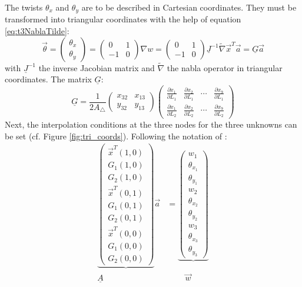   The twists $\theta_x$ and $\theta_y$ are to be described in Cartesian coordinates. They must be transformed into triangular coordinates with the help of equation \eqref{eq:t3NablaTilde}:
  \begin{equation}
  \vec{\theta} = \begin{pmatrix}
  \theta_x\\\theta_y
  \end{pmatrix} = \begin{pmatrix}
  0 & 1 \\ -1 & 0
  \end{pmatrix} \nabla w = \begin{pmatrix}
  0 & 1 \\ -1 & 0
  \end{pmatrix} \underline{J}^{-1} \tilde{\nabla} \vec{x}^T \vec{a} = \underline{G} \vec{a}
  \end{equation}
  with $\underline{J}^{-1}$ the inverse Jacobian matrix and $\tilde{\nabla}$ the nabla operator in triangular coordinates. The matrix $\underline{G}$:
  \begin{equation}
  \underline{G} = \frac{1}{2 A_\triangle} \begin{pmatrix}
  x_{32} & x_{13} \\ y_{32} & y_{13}
  \end{pmatrix} \begin{pmatrix}
  \frac{\partial x_1}{\partial L_1} & \frac{\partial x_2}{\partial L_1} & \cdots & \frac{\partial x_9}{\partial L_1} \\
  \frac{\partial x_1}{\partial L_2} & \frac{\partial x_2}{\partial L_2} & \cdots & \frac{\partial x_9}{\partial L_2}
  \end{pmatrix}
  \end{equation}
  Next, the interpolation conditions at the three nodes for the three unknowns can be set (cf. Figure \ref{fig:tri_coords}). Following the notation of \cite{steinke2005finite}:
  \begin{align}
  \underbrace{\begin{pmatrix}
  	\vec{x}^T(1,0)\\G_1(1,0)\\G_2(1,0)\\
  	\vec{x}^T(0,1)\\G_1(0,1)\\G_2(0,1)\\
  	\vec{x}^T(0,0)\\G_1(0,0)\\G_2(0,0)
  	\end{pmatrix}} \vec{a} &= \underbrace{\begin{pmatrix}
  	w_1\\\theta_{x_1}\\\theta_{y_1}\\
  	w_2\\\theta_{x_2}\\\theta_{y_2}\\
  	w_3\\\theta_{x_3}\\\theta_{y_3}
  	\end{pmatrix}}\\
  \underline{A}\qquad\quad &\qquad\ \vec{w}
  \end{align}
